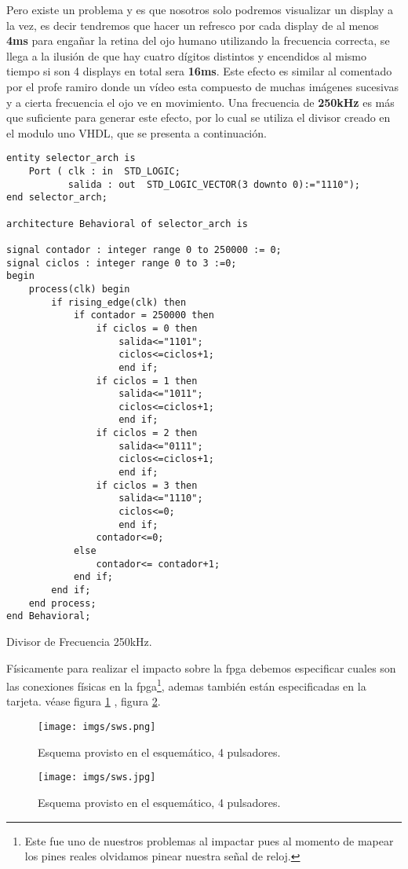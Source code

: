 \documentclass[paper=a4, fontsize=12pt]{article} 		%
\numberwithin{equation}{section}						%
\numberwithin{table}{section} 							%
\begin{document}
Pero existe un problema y es que nosotros solo podremos visualizar un display a la vez, es decir tendremos que hacer un refresco por cada display de al menos \textbf{4ms} para engañar la retina del ojo humano utilizando la frecuencia correcta, se llega a la ilusión de que hay cuatro dígitos distintos y encendidos al mismo tiempo si son 4 displays en total sera \textbf{16ms}. Este efecto es similar al comentado por el profe ramiro donde un vídeo esta compuesto de muchas imágenes sucesivas y a cierta frecuencia el ojo ve en movimiento. Una frecuencia de \textbf{250kHz} es más que suficiente para generar este efecto, por lo cual se utiliza el divisor creado en el modulo uno VHDL, que se presenta a continuación. 

\begin{listing}[H]
	\begin{verbatim}
entity selector_arch is
    Port ( clk : in  STD_LOGIC;
           salida : out  STD_LOGIC_VECTOR(3 downto 0):="1110");
end selector_arch;

architecture Behavioral of selector_arch is

signal contador : integer range 0 to 250000 := 0;
signal ciclos : integer range 0 to 3 :=0;
begin
	process(clk) begin
		if rising_edge(clk) then
			if contador = 250000 then
				if ciclos = 0 then
					salida<="1101";
					ciclos<=ciclos+1;
					end if;
				if ciclos = 1 then
					salida<="1011";
					ciclos<=ciclos+1;
					end if;
				if ciclos = 2 then
					salida<="0111";
					ciclos<=ciclos+1;
					end if;
				if ciclos = 3 then
					salida<="1110";
					ciclos<=0;
					end if;
				contador<=0;
			else
				contador<= contador+1;
			end if;
		end if;
	end process;
end Behavioral;
\end{verbatim}
\caption{Divisor de Frecuencia 250kHz.}
    \label{mux2}
\end{listing}

Físicamente para realizar el impacto sobre la fpga debemos especificar cuales son las conexiones físicas en la fpga\footnote{Este fue uno de nuestros problemas al impactar pues al momento de mapear los pines reales olvidamos pinear nuestra señal de reloj.}, ademas también están especificadas en la tarjeta. véase figura \ref{Sw1} , figura \ref{Sw2}.
\begin{figure}[H]
  \centering
     \texttt{[image: imgs/sws.png]}
  \caption{Esquema provisto en el esquemático, 4 pulsadores.}
    \label{Sw1}
\end{figure}
\begin{figure}[H]
  \centering
     \texttt{[image: imgs/sws.jpg]}
  \caption{Esquema provisto en el esquemático, 4 pulsadores.}
    \label{Sw2}
\end{figure}
\end{document}
